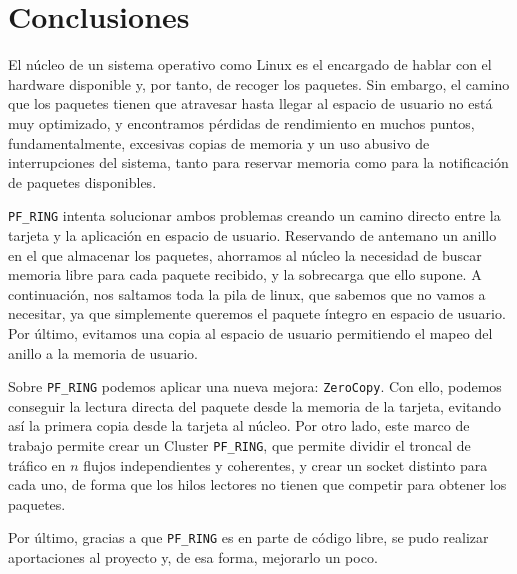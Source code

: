 \section{Conclusiones}
El núcleo de un sistema operativo como Linux es el encargado de hablar con el hardware disponible y, por tanto, de 
recoger los paquetes. Sin embargo, el camino que los paquetes tienen que atravesar hasta llegar al espacio de usuario 
no está muy optimizado, y encontramos pérdidas de rendimiento en muchos puntos, fundamentalmente, excesivas copias de 
memoria y un uso abusivo de interrupciones del sistema, tanto para reservar memoria como para la notificación de 
paquetes disponibles.

\texttt{PF\_RING} intenta solucionar ambos problemas creando un camino directo entre la tarjeta y la aplicación en 
espacio de usuario. Reservando de antemano un anillo en el que almacenar los paquetes, ahorramos al núcleo la necesidad 
de buscar memoria libre para cada paquete recibido, y la sobrecarga que ello supone. A continuación, nos saltamos toda 
la pila de linux, que sabemos que no vamos a necesitar, ya que simplemente queremos el paquete íntegro en espacio de 
usuario. Por último, evitamos una copia al espacio de usuario permitiendo el mapeo del anillo a la memoria de usuario.

Sobre \texttt{PF\_RING} podemos aplicar una nueva mejora: \texttt{ZeroCopy}. Con ello, podemos conseguir la lectura 
directa del paquete desde la memoria de la tarjeta, evitando así la primera copia desde la tarjeta al núcleo. Por otro 
lado, este marco de trabajo permite crear un Cluster \texttt{PF\_RING}, que permite dividir el troncal de tráfico en 
$n$ flujos independientes y coherentes, y crear un socket distinto para cada uno, de forma que los hilos lectores no 
tienen que competir para obtener los paquetes.

Por último, gracias a que \texttt{PF\_RING} es en parte de código libre, se pudo realizar aportaciones al proyecto y, 
de esa forma, mejorarlo un poco.

